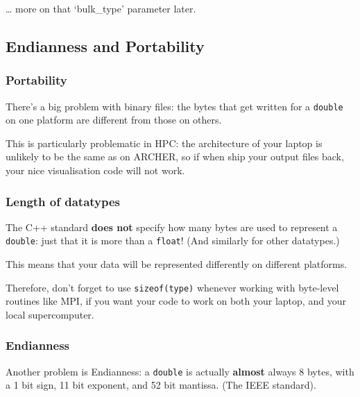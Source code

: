 \begin{Shaded}
\begin{Highlighting}[]

                 
\end{Highlighting}
\end{Shaded}

\ldots{} more on that `bulk\_type' parameter later.

\subsection{Endianness and
Portability}\label{endianness-and-portability}

\subsubsection{Portability}\label{portability}

There's a big problem with binary files: the bytes that get written for
a \texttt{double} on one platform are different from those on others.

This is particularly problematic in HPC: the architecture of your laptop
is unlikely to be the same as on ARCHER, so if when ship your output
files back, your nice visualisation code will not work.

\subsubsection{Length of datatypes}\label{length-of-datatypes}

The C++ standard \textbf{does not} specify how many bytes are used to
represent a \texttt{double}: just that it is more than a \texttt{float}!
(And similarly for other datatypes.)

This means that your data will be represented differently on different
platforms.

Therefore, don't forget to use \texttt{sizeof(type)} whenever working
with byte-level routines like MPI, if you want your code to work on both
your laptop, and your local supercomputer.

\subsubsection{Endianness}\label{endianness}

Another problem is Endianness: a \texttt{double} is actually
\textbf{almost} always 8 bytes, with a 1 bit sign, 11 bit exponent, and
52 bit mantissa. (The IEEE standard).

